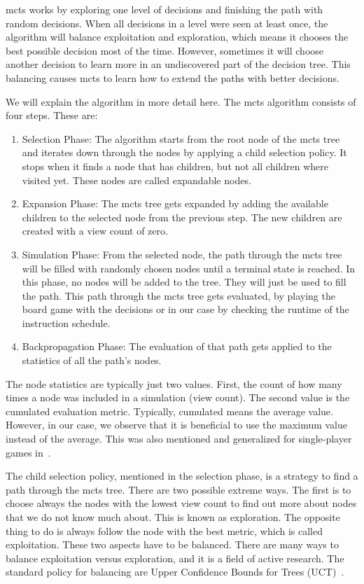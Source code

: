 \ac{mcts} works by exploring one level of decisions  and finishing the path with random decisions.
When all decisions in a level were seen at least once, the algorithm will balance exploitation and exploration, which means it chooses the best possible decision most of the time.
However, sometimes it will choose another decision to learn more in an undiscovered part of the decision tree.
This balancing causes \ac{mcts} to learn how to extend the paths with better decisions.

We will explain the algorithm in more detail here.
The \ac{mcts} algorithm consists of four steps.
These are:
\begin{enumerate}
    \item Selection Phase:
        The algorithm starts from the root node of the \ac{mcts} tree and iterates down through the nodes by applying a child selection policy.
        It stops when it finds a node that has children, but not all children where visited yet.
        These nodes are called expandable nodes.
    \item Expansion Phase:
        The \ac{mcts} tree gets expanded by adding the available children to the selected node from the previous step.
        The new children are created with a view count of zero.
    \item Simulation Phase:
        From the selected node, the path through the \ac{mcts} tree will be filled with randomly chosen nodes until a terminal state is reached.
        In this phase, no nodes will be added to the tree.
        They will just be used to fill the path.
        This path through the \ac{mcts} tree gets evaluated, \eg by playing the board game with the decisions or in our case by checking the runtime of the instruction schedule.
    \item Backpropagation Phase:
        The evaluation of that path gets applied to the statistics of all the path's nodes.
\end{enumerate}
The node statistics are typically just two values.
First, the count of how many times a node was included in a simulation (view count).
The second value is the cumulated evaluation metric.
Typically, cumulated means the average value.
However, in our case, we observe that it is beneficial to use the maximum value instead of the average.
This was also mentioned and generalized for single-player games in~\cite{bjornsson2009cadiaplayer}.

The child selection policy, mentioned in the selection phase, is a strategy to find a path through the \ac{mcts} tree.
There are two possible extreme ways.
The first is to choose always the nodes with the lowest view count to find out more about nodes that we do not know much about.
This is known as exploration.
The opposite thing to do is always follow the node with the best metric, which is called exploitation.
These two aspects have to be balanced.
There are many ways to balance exploitation versus exploration, and it is a field of active research.
The standard policy for balancing are Upper Confidence Bounds for Trees (UCT)~\cite{kocsis2006bandit,kocsis2006improved}.

